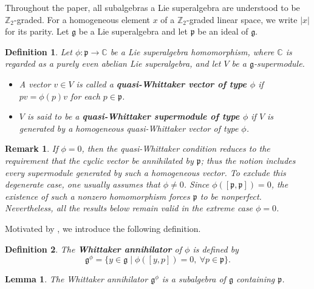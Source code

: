 \documentclass[12pt,reqno]{article}
\newtheorem{lem}[thm]{Lemma}
\newtheorem{Def}{Definition}[section]
\newtheorem{rem}{Remark}
\def\F{\mathfrak}
\def\CC{\mathbb{C}}
\def\ZZ{\mathbb{Z}}
\def\beqn{\begin{equation*}}
\def\eeqn{\end{equation*}}
\begin{document}
Throughout the paper, all subalgebras  a Lie superalgebra are understood to be $\ZZ_2$-graded. For a homogeneous element $x$ of a $\ZZ_2$-graded linear space, we write $|x|$ for its parity. Let $\F{g}$ be a Lie superalgebra and let $\F{p}$ be an ideal of $\F{g}$.

\begin{Def}
Let $\phi\colon\F{p}\rightarrow\CC$ be a Lie superalgebra homomorphism, where $\CC$ is regarded as a purely even abelian Lie superalgebra, and let $V$ be a $\F{g}$-supermodule.
\begin{itemize}
	\item[(1)] A vector $v\in V$ is called a {\bf quasi-Whittaker vector of type $\phi$} if $pv=\phi(p)v$ for each $p\in\F{p}$.
	\item[(2)] $V$ is said to be a {\bf quasi-Whittaker supermodule of type $\phi$} if $V$ is generated by a homogeneous quasi-Whittaker vector of type $\phi$.
\end{itemize}	
\end{Def}

\begin{rem}
If $\phi=0$, then the quasi-Whittaker condition reduces to the 
requirement that the cyclic vector be annihilated by $\F{p}$; thus
the notion includes every supermodule generated by such a homogeneous
 vector. To exclude this degenerate case, one usually assumes that 
 $\phi\neq0$. Since $\phi([\F{p},\F{p}])=0$, the existence of such a
 nonzero homomorphism forces $\F{p}$ to be nonperfect. Nevertheless,
 all the results below remain valid in the extreme case $\phi=0$.
\end{rem}

Motivated by \cite{CGLZZ}, we introduce the following definition.


\begin{Def}
The {\bf Whittaker annihilator} of $\phi$ is defined by
\beqn
\F{g}^{\phi}=\{y\in\F{g}\mid \phi([y, p])=0, ~\forall p\in\F{p}\}.
\eeqn	
\end{Def}

\begin{lem}
The Whittaker annihilator $\F{g}^{\phi}$ is a subalgebra of $\F{g}$ containing $\F{p}$.	
\end{lem}
\end{document}
